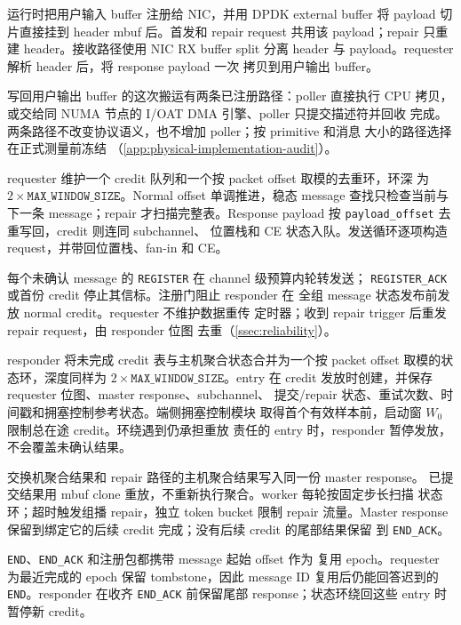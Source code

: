 运行时把用户输入 buffer 注册给 NIC，并用 DPDK external buffer 将
payload 切片直接挂到 header mbuf 后。首发和 repair request 共用该
payload；repair 只重建 header。接收路径使用 NIC RX buffer split 分离
header 与 payload。requester 解析 header 后，将 response payload 一次
拷贝到用户输出 buffer。

写回用户输出 buffer 的这次搬运有两条已注册路径：poller 直接执行 CPU
拷贝，或交给同 NUMA 节点的 I/OAT DMA 引擎、poller 只提交描述符并回收
完成。两条路径不改变协议语义，也不增加 poller；按 primitive 和消息
大小的路径选择在正式测量前冻结
（\cref{app:physical-implementation-audit}）。

requester 维护一个 credit 队列和一个按 packet offset 取模的去重环，环深
为 $2\times\texttt{MAX\_WINDOW\_SIZE}$。Normal offset 单调推进，稳态
message 查找只检查当前与下一条 message；repair 才扫描完整表。Response
payload 按 \texttt{payload\_offset} 去重写回，credit 则连同 subchannel、
位置栈和 CE 状态入队。发送循环逐项构造 request，并带回位置栈、fan-in
和 CE。

每个未确认 message 的 \texttt{REGISTER} 在 channel 级预算内轮转发送；
\texttt{REGISTER\_ACK} 或首份 credit 停止其信标。注册门阻止 responder 在
全组 message 状态发布前发放 normal credit。requester 不维护数据重传
定时器；收到 repair trigger 后重发 repair request，由 responder 位图
去重（\cref{ssec:reliability}）。

responder 将未完成 credit 表与主机聚合状态合并为一个按 packet offset
取模的状态环，深度同样为 $2\times\texttt{MAX\_WINDOW\_SIZE}$。entry 在
credit 发放时创建，并保存 requester 位图、master response、subchannel、
提交/repair 状态、重试次数、时间戳和拥塞控制参考状态。端侧拥塞控制模块
取得首个有效样本前，启动窗 $W_0$ 限制总在途 credit。环绕遇到仍承担重放
责任的 entry 时，responder 暂停发放，不会覆盖未确认结果。

交换机聚合结果和 repair 路径的主机聚合结果写入同一份 master response。
已提交结果用 mbuf clone 重放，不重新执行聚合。worker 每轮按固定步长扫描
状态环；超时触发组播 repair，独立 token bucket 限制 repair 流量。Master
response 保留到绑定它的后续 credit 完成；没有后续 credit 的尾部结果保留
到 \texttt{END\_ACK}。

\texttt{END}、\texttt{END\_ACK} 和注册包都携带 message 起始 offset 作为
复用 epoch。requester 为最近完成的 epoch 保留 tombstone，因此 message
ID 复用后仍能回答迟到的 \texttt{END}。responder 在收齐 \texttt{END\_ACK}
前保留尾部 response；状态环绕回这些 entry 时暂停新 credit。

